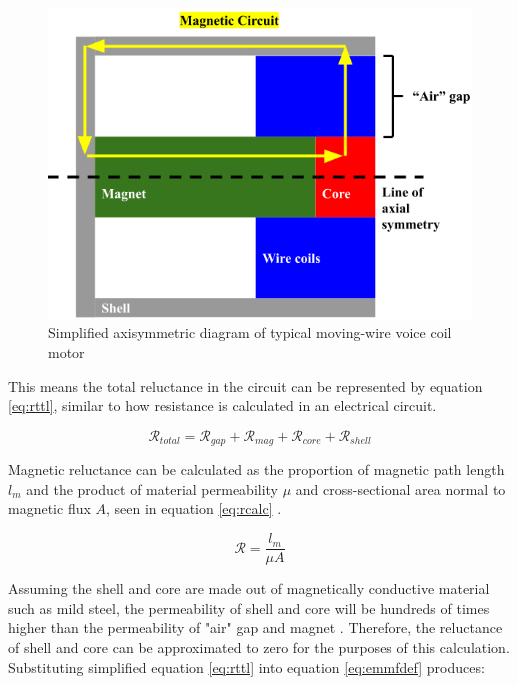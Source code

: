 \documentclass[a4paper,12pt]{article}
\begin{document}
\begin{figure}[h!]
    \centering
    \includegraphics[scale=0.4]{simplifiedMotor.png}
    \caption{Simplified axisymmetric diagram of typical moving-wire voice coil motor}
    \label{fg:simplemotor}
\end{figure}

This means the total reluctance in the circuit can be represented by equation \ref{eq:rttl}, similar to how resistance is calculated in an electrical circuit.

\begin{equation}\label{eq:rttl}
    \mathcal{R}_{total}=\mathcal{R}_{gap}+\mathcal{R}_{mag}+\mathcal{R}_{core}+\mathcal{R}_{shell}
\end{equation}

Magnetic reluctance can be calculated as the proportion of magnetic path length $l_m$ and the product of material permeability $\mu$ and cross-sectional area normal to magnetic flux $A$, seen in equation \ref{eq:rcalc} \cite{coatesTransformerCoresReluctance2018}.

\begin{equation}\label{eq:rcalc}
    \mathcal{R}=\frac{l_m}{\mu A}
\end{equation}

Assuming the shell and core are made out of magnetically conductive material such as mild steel, the permeability of shell and core will be hundreds of times higher than the permeability of "air" gap and magnet \cite{engineeringtoolboxPermeability2016}. Therefore, the reluctance of shell and core can be approximated to zero for the purposes of this calculation.
Substituting simplified equation \ref{eq:rttl} into equation \ref{eq:emmfdef} produces:
\end{document}
